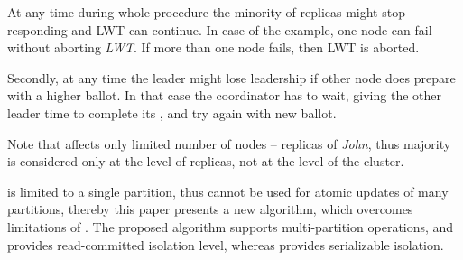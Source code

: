 At any time during whole procedure the minority of replicas might stop responding and LWT can continue. In case of the example, one node can fail without aborting \emph{LWT}. If more than one node fails, then LWT is aborted. 

Secondly, at any time the leader might lose leadership if other node does prepare with a higher ballot. In that case the coordinator has to wait, giving the other leader time to complete its \lwt, and try again with new ballot.

Note that \lwt affects only limited number of nodes -- replicas of \emph{John}, thus majority is considered only at the level of replicas, not at the level of the cluster.

\lwt is limited to a single partition, thus \lwt cannot be used for atomic updates of many partitions, thereby this paper presents a new algorithm, which overcomes limitations of \lwt.
The proposed algorithm supports multi-partition operations, and provides read-committed isolation level, whereas \lwt provides serializable isolation.


